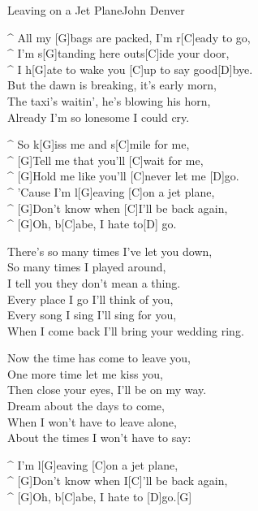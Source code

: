 \begin{song}{Leaving on a Jet Plane}{John Denver}

\begin{guitar}
^ All my [G]bags are packed, I'm r[C]eady to go,\\
^ I'm s[G]tanding here outs[C]ide your door,\\
^ I h[G]ate to wake you [C]up to say good[D]bye.\\
But the dawn is breaking, it's early morn,\\
The taxi's waitin', he's blowing his horn,\\
Already I'm so lonesome I could cry.\\
\end{guitar}

\begin{guitar}
^ So k[G]iss me and s[C]mile for me,\\
^ [G]Tell me that you'll [C]wait for me, \\
^ [G]Hold me like you'll [C]never let me [D]go.\\
^ 'Cause I'm l[G]eaving [C]on a jet plane, \\
^ [G]Don't know when [C]I'll be back again,\\
^ [G]Oh, b[C]abe, I hate to[D] go.\\
\end{guitar}

\begin{guitar}
There's so many times I've let you down,\\
So many times I played around,\\
I tell you they don't mean a thing.\\
Every place I go I'll think of you,\\
Every song I sing I'll sing for you, \\
When I come back I'll bring your wedding ring.\\
\end{guitar}


\begin{guitar}
Now the time has come to leave you,\\
One more time let me kiss you,\\
Then close your eyes, I'll be on my way.\\
Dream about the days to come,\\
When I won't have to leave alone,\\
About the times I won't have to say:\\
\end{guitar}


\begin{guitar}
^ I'm l[G]eaving [C]on a jet plane,\\
^ [G]Don't know when I[C]'ll be back again,\\
^ [G]Oh, b[C]abe, I hate to [D]go.[G]\\
\end{guitar}
\end{song}
